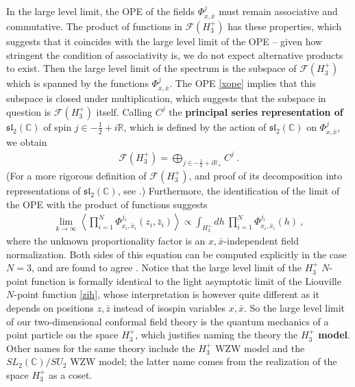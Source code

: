 \documentclass[12pt,a4paper,notitlepage]{report}
\numberwithin{equation}{section}
\theoremstyle{break}
\begin{document}
In the large level limit, the OPE of the fields $\Phi^j_{x,\bar{x}}$ must remain associative and commutative. 
The product of functions in $\mathcal{F}(H_3^+)$ has these properties, which suggests that it coincides with the large level limit of the OPE -- given how stringent the condition of associativity is, we do not expect alternative products to exist. 
Then the large level limit of the spectrum is the subspace of 
$\mathcal{F}(H_3^+)$ which is spanned by the functions $\Phi^j_{x,\bar{x}}$.
The OPE \eqref{xope} implies that this subspace is closed under multiplication, which suggests that the subspace in question is $\mathcal{F}(H_3^+)$ itself. 
Calling $C^j$ the \textbf{\boldmath principal series representation of $\mathfrak{sl}_2({\mathbb{C}})$} of spin $j\in -\frac12 +i{\mathbb{R}}$, which is defined by the action of $\mathfrak{sl}_2({\mathbb{C}})$ on $\Phi^j_{x,\bar{x}}$, we obtain
\begin{align}
 \mathcal{F}(H_3^+) = \bigoplus_{j\in -\frac12+i{\mathbb{R}}_+} C^j\ .
\end{align}
(For a more rigorous definition of $\mathcal{F}(H_3^+)$, and proof of its decomposition into representations of $\mathfrak{sl}_2({\mathbb{C}})$, see \cite{tes97b}.)
Furthermore, the identification of the limit of the OPE with the product of functions suggests
\begin{align}
 \underset{k\rightarrow \infty}{\lim} \left\langle \prod_{i=1}^N \Phi^{j_i}_{x_i,\bar{x}_i}(z_i,\bar{z}_i)\right\rangle \propto \int_{H_3^+} dh\ \prod_{i=1}^N \Phi^{j_i}_{x_i,\bar{x}_i}(h)\ , 
\end{align}
where the unknown proportionality factor is an $x,\bar{x}$-independent field normalization.
Both sides of this equation can be computed explicitly in the case $N=3$, and are found to agree \cite{tes97b}.
Notice that the large level limit of the $H_3^+$ $N$-point function is formally identical to the light asymptotic limit of the Liouville $N$-point function \eqref{zih}, whose interpretation is however quite different as it depends on positions $z,\bar{z}$ instead of isospin variables $x,\bar{x}$.
So the large level limit of our two-dimensional conformal field theory is the quantum mechanics of a point particle on the space $H_3^+$, which justifies naming the theory the \textbf{\boldmath $H_3^+$ model}.
Other names for the same theory include the $H_3^+$ WZW model and the $SL_2({\mathbb{C}})/SU_2$ WZW model; the latter name comes from the realization of the space $H_3^+$ as a coset.
\end{document}
